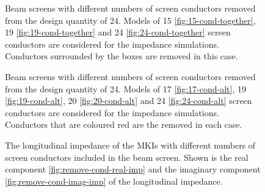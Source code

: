 \begin{figure}
\subfigure[]{
\label{fig:15-cond-together}
}
\subfigure[]{
\label{fig:19-cond-together}
}
\subfigure[]{
\label{fig:24-cond-together}
}
\label{fig:mki-take-away-cond-together}
\caption{Beam screens with different numbers of screen conductors removed from the design quantity of 24. Models of 15 \ref {fig:15-cond-together}, 19 \ref{fig:19-cond-together} and 24 \ref{fig:24-cond-together} screen conductors are considered for the impedance simulations. Conductors surrounded by the boxes are removed in this case.}
\end{figure}

\begin{figure}
\subfigure[]{
\label{fig:17-cond-alt}
}
\subfigure[]{
\label{fig:19-cond-alt}
}
\subfigure[]{
\label{fig:20-cond-alt}
}
\subfigure[]{
\label{fig:24-cond-alt}
}
\label{fig:mki-take-away-cond-ql5}
\caption{Beam screens with different numbers of screen conductors removed from the design quantity of 24. Models of 17 \ref {fig:17-cond-alt}, 19 \ref{fig:19-cond-alt}, 20 \ref{fig:20-cond-alt} and 24 \ref{fig:24-cond-alt} screen conductors are considered for the impedance simulations. Conductors that are coloured red are the removed in each case.}
\end{figure}

\begin{figure}

\label{fig:remove-cond-impedance}
\caption{The longitudinal impedance of the MKIs with different numbers of screen conductors included in the beam screen. Shown is the real component \ref{fig:remove-cond-real-imp} and the imaginary component \ref{fig:remove-cond-imag-imp} of the longitudinal impedance.}
\end{figure}


